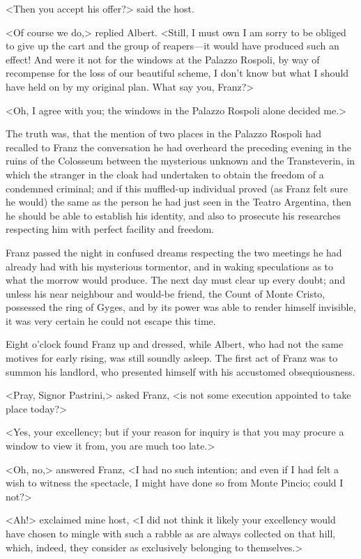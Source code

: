  <Then you accept his offer?> said the host. 

 <Of course we do,> replied Albert. <Still, I must own I am sorry to be obliged to give up the cart and the group of reapers—it would have produced such an effect! And were it not for the windows at the Palazzo Rospoli, by way of recompense for the loss of our beautiful scheme, I don't know but what I should have held on by my original plan. What say you, Franz?> 

 <Oh, I agree with you; the windows in the Palazzo Rospoli alone decided me.> 

 The truth was, that the mention of two places in the Palazzo Rospoli had recalled to Franz the conversation he had overheard the preceding evening in the ruins of the Colosseum between the mysterious unknown and the Transteverin, in which the stranger in the cloak had undertaken to obtain the freedom of a condemned criminal; and if this muffled-up individual proved (as Franz felt sure he would) the same as the person he had just seen in the Teatro Argentina, then he should be able to establish his identity, and also to prosecute his researches respecting him with perfect facility and freedom. 

 Franz passed the night in confused dreams respecting the two meetings he had already had with his mysterious tormentor, and in waking speculations as to what the morrow would produce. The next day must clear up every doubt; and unless his near neighbour and would-be friend, the Count of Monte Cristo, possessed the ring of Gyges, and by its power was able to render himself invisible, it was very certain he could not escape this time. 

 Eight o'clock found Franz up and dressed, while Albert, who had not the same motives for early rising, was still soundly asleep. The first act of Franz was to summon his landlord, who presented himself with his accustomed obsequiousness. 

 <Pray, Signor Pastrini,> asked Franz, <is not some execution appointed to take place today?> 

 <Yes, your excellency; but if your reason for inquiry is that you may procure a window to view it from, you are much too late.> 

 <Oh, no,> answered Franz, <I had no such intention; and even if I had felt a wish to witness the spectacle, I might have done so from Monte Pincio; could I not?> 

 <Ah!> exclaimed mine host, <I did not think it likely your excellency would have chosen to mingle with such a rabble as are always collected on that hill, which, indeed, they consider as exclusively belonging to themselves.> 

